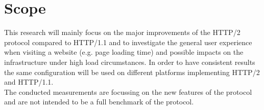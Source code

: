 \section{Scope}
\label{scope}
This research will mainly focus on the major improvements of the HTTP/2 protocol compared to HTTP/1.1 and to investigate the general user experience when visiting a website (e.g. page loading time) and possible impacts on the infrastructure under high load circumstances. In order to have consistent results the same configuration will be used on different platforms implementing HTTP/2 and HTTP/1.1. 
\\
The conducted measurements are focussing on the new features of the protocol and are not intended to be a full benchmark of the protocol.

